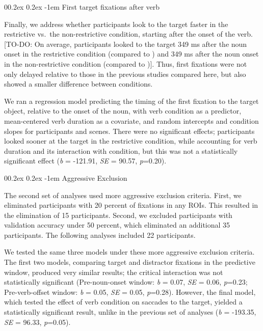 \documentclass[
  man,floatsintext]{apa6}
\makeatletter
\let\oldparagraph\paragraph
\renewcommand{\paragraph}[1]{\oldparagraph{#1}\mbox{}}
\renewcommand{\paragraph}{\@startsection{paragraph}{4}{\parindent}%
  {0\baselineskip \@plus 0.2ex \@minus 0.2ex}%
  {-1em}%
  {\normalfont\normalsize\bfseries\itshape\typesectitle}}
\makeatother
\begin{document}
\hypertarget{first-target-fixations-after-verb}{%
\paragraph{First target fixations after verb}\label{first-target-fixations-after-verb}}

Finally, we address whether participants look to the target faster in the restrictive vs.~the non-restrictive condition, starting after the onset of the verb. {[}TO-DO: On average, participants looked to the target 349 ms after the noun onset in the restrictive condition (compared to ) and 349 ms after the noun onset in the non-restrictive condition (compared to ){]}. Thus, first fixations were not only delayed relative to those in the previous studies compared here, but also showed a smaller difference between conditions.

We ran a regression model predicting the timing of the first fixation to the target object, relative to the onset of the noun, with verb condition as a predictor, mean-centered verb duration as a covariate, and random intercepts and condition slopes for participants and scenes. There were no significant effects; participants looked sooner at the target in the restrictive condition, while accounting for verb duration and its interaction with condition, but this was not a statistically significant effect (\emph{b} = -121.91, \emph{SE} = 90.57, \emph{p}=0.20).

\hypertarget{aggressive-exclusion}{%
\paragraph{Aggressive Exclusion}\label{aggressive-exclusion}}

The second set of analyses used more aggressive exclusion criteria. First, we eliminated participants with 20 percent of fixations in any ROIs. This resulted in the elimination of 15 participants. Second, we excluded participants with validation accuracy under 50 percent, which eliminated an additional 35 participants. The following analyses included 22 participants.

We tested the same three models under these more aggressive exclusion criteria. The first two models, comparing target and distractor fixations in the predictive window, produced very similar results; the critical interaction was not statistically significant (Pre-noun-onset window: \emph{b} = 0.07, \emph{SE} = 0.06, \emph{p}=0.23; Pre-verb-offset window: \emph{b} = 0.05, \emph{SE} = 0.05, \emph{p}=0.28). However, the final model, which tested the effect of verb condition on saccades to the target, yielded a statistically significant result, unlike in the previous set of analyses (\emph{b} = -193.35, \emph{SE} = 96.33, \emph{p}=0.05).
\end{document}
